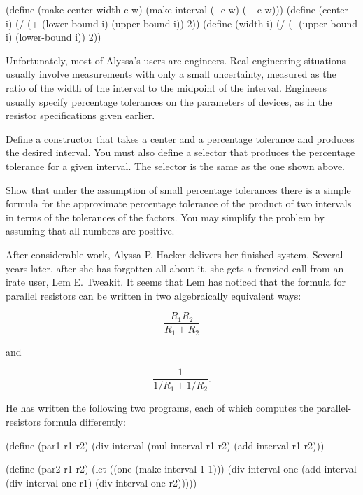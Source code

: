 \begin{exerciseGroup}
\begin{codeBlock}
(define (make-center-width c w)
  (make-interval (- c w) (+ c w)))
(define (center i)
  (/ (+ (lower-bound i) (upper-bound i)) 2))
(define (width i)
  (/ (- (upper-bound i) (lower-bound i)) 2))
\end{codeBlock}

Unfortunately, most of Alyssa's users are engineers.  Real engineering
situations usually involve measurements with only a small uncertainty, measured
as the ratio of the width of the interval to the midpoint of the interval.
Engineers usually specify percentage tolerances on the parameters of devices,
as in the resistor specifications given earlier.

\label{Exercise 2.12}
 Define a constructor
 that takes a center and a percentage tolerance and
produces the desired interval.  You must also define a selector 
that produces the percentage tolerance for a given interval.  The 
selector is the same as the one shown above.

\label{Exercise 2.13}
 Show that under the assumption of
small percentage tolerances there is a simple formula for the approximate
percentage tolerance of the product of two intervals in terms of the tolerances
of the factors.  You may simplify the problem by assuming that all numbers are
positive.

After considerable work, Alyssa P. Hacker delivers her finished system.
Several years later, after she has forgotten all about it, she gets a frenzied
call from an irate user, Lem E. Tweakit.  It seems that Lem has noticed that
the formula for parallel resistors can be written in two algebraically
equivalent ways:

$$ \frac{R_1 R_2}{R_1 + R_2} $$

\noindent
and

$$ \frac{1}{1 / R_1 + 1 / R_2}. $$

He has written the following two programs, each of which computes the
parallel-resistors formula differently:

\begin{codeBlock}
(define (par1 r1 r2)
  (div-interval (mul-interval r1 r2)
                (add-interval r1 r2)))
\end{codeBlock}

\begin{codeBlock}
(define (par2 r1 r2)
  (let ((one (make-interval 1 1)))
    (div-interval
     one (add-interval (div-interval one r1)
                       (div-interval one r2)))))
\end{codeBlock}


\end{exerciseGroup}
